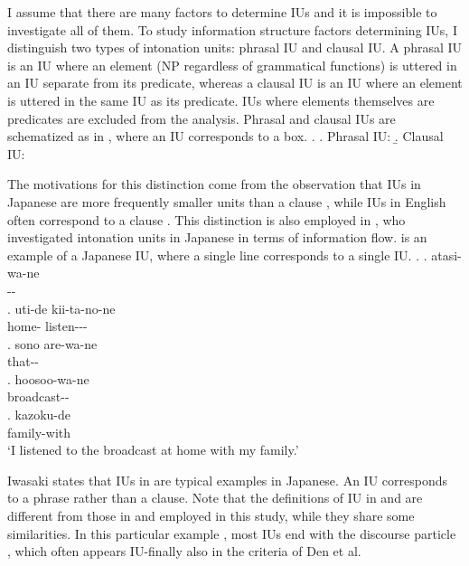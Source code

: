 I assume that there are many factors to determine IUs
and it is impossible to investigate all of them.
To study information structure factors determining IUs,
I distinguish two types of intonation units:
phrasal IU and clausal IU.
A phrasal IU is an IU where an element (NP regardless of grammatical functions) is uttered in an IU separate from its predicate, whereas
a clausal IU is an IU where an element is uttered in the same IU as its predicate.
IUs where elements themselves are predicates are excluded from the analysis.
Phrasal and clausal IUs are schematized as in \Next,
where an IU corresponds to a box.
%
\ex.
 \a. Phrasal IU:  
 \b. Clausal IU: 

The motivations for this distinction come from the observation that IUs in Japanese are more frequently smaller units than a clause \cite{iwasaki93},
while IUs in English often correspond to a clause \cite{chafe94}.
This distinction is also employed in ,
who investigated intonation units in Japanese in terms of information flow.
\Next is an example of a Japanese IU,
where a single line corresponds to a single IU.
%
\ex.
 \ag. atasi-wa-ne \\
 		-- \\
 \bg. uti-de kii-ta-no-ne \\
 	home- listen--- \\
 \bg. sono are-wa-ne \\
 	 that-- \\
 \bg. hoosoo-wa-ne \\
 	broadcast--\\
 \bg. kazoku-de \\
 	family-with \\
	`I listened to the broadcast at home with my family.'
	\hfill{\cite[][p.~40]{iwasaki93}}

Iwasaki states that IUs in \Last are typical examples in Japanese.
An IU corresponds to a phrase rather than a clause.
Note that the definitions of IU in  and  are different from those in  and  employed in this study,
while they share some similarities.
In this particular example \Last,
most IUs end with the discourse particle ,
which often appears IU-finally also in the criteria of Den et al.


